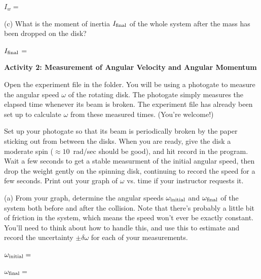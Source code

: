 \medskip
\hspace{0.5in} $I_w =$
\answerspace{0.6in}
\pagebreak[3]


(c) What is the moment of inertia $I_{\rm final}$ of the whole system after the mass has been dropped on the disk?

\medskip

\hspace{0.5in} $I_{\rm final}$ = 
\answerspace{0.4in}

\bigskip
\textbf{Activity 2: Measurement of Angular Velocity and Angular Momentum}

Open the experiment file  in the \filename{\coursefolder} folder.  
You will be using a photogate to measure the angular speed $\omega$ of the rotating disk.  The photogate simply measures the elapsed time whenever its beam is broken.  The experiment file has already been set up to calculate $\omega$ from these measured times.  (You're welcome!)

Set up your photogate so that its beam is periodically broken by the paper sticking out from between the disks.  When you are ready, give the disk a moderate spin ($\approx 10$~rad/sec should be good), and hit record in the program.  Wait a few seconds to get a stable measurment of the initial angular speed, then drop the weight gently on the spinning disk, continuing to record the speed for a few seconds.  Print out your graph of $\omega$ vs. time if your instructor requests it.

(a) From your graph, determine the angular speeds $\omega_{\rm initial}$ and $\omega_{\rm final}$ of the system both before and after the collision.  Note that there's probably a little bit of friction in the system, which means the speed won't ever be exactly constant.  You'll need to think about how to handle this, and use this to estimate and record the uncertainty $\pm \delta \omega$ for each of your measurements.

\medskip
\hspace{0.5in} $\omega_{\rm initial} =$

\bigskip
\hspace{0.5in} $\omega_{\rm final} =$
\answerspace{0.3in}

